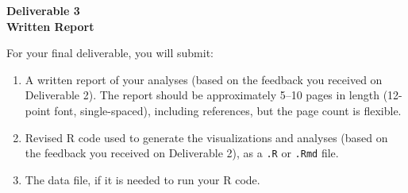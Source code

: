 \documentclass[12pt]{article}
\begin{document}
\begin{center}
\textbf{\Large Deliverable 3 \\ Written Report}
\end{center}

For your final deliverable, you will submit:
\begin{enumerate}
    \item A written report of your analyses (based on the feedback you received on Deliverable 2). The report should be approximately 5--10 pages in length (12-point font, single-spaced), including references, but the page count is flexible.
    \item Revised R code used to generate the visualizations and analyses (based on the feedback you received on Deliverable 2), as a \texttt{.R} or \texttt{.Rmd} file.
    \item The data file, if it is needed to run your R code.
\end{enumerate}
\end{document}
